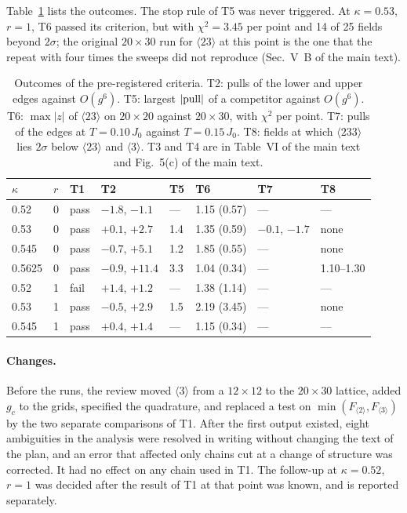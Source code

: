 \documentclass[aps,prb,twocolumn,superscriptaddress,floatfix]{revtex4-2}
\begin{document}
Table~\ref{tab:prereg} lists the outcomes. The stop rule of T5 was never triggered. At $\kappa=0.53$, $r=1$, T6
passed its criterion, but with $\chi^2=3.45$ per point and 14 of 25 fields beyond $2\sigma$; the original $20\times30$ run
for $\langle23\rangle$ at this point is the one that the repeat with four times the sweeps did not reproduce
(Sec.~V~B of the main text).

\begin{table}
\caption{Outcomes of the pre-registered criteria. T2: pulls of the lower and upper edges against $O(g^6)$. T5: largest
$|{\rm pull}|$ of a competitor against $O(g^6)$. T6: $\max|z|$ of $\langle23\rangle$ on $20\times20$ against
$20\times30$, with $\chi^2$ per point. T7: pulls of the edges at $T=0.10\,J_0$ against $T=0.15\,J_0$. T8: fields at which
$\langle233\rangle$ lies $2\sigma$ below $\langle23\rangle$ and $\langle3\rangle$. T3 and T4 are in
Table~VI of the main text and Fig.~5(c) of the main text.}
\label{tab:prereg}
\footnotesize
\begin{ruledtabular}
\begin{tabular}{llllllll}
$\kappa$ & $r$ & T1 & T2 & T5 & T6 & T7 & T8 \\
\hline
0.52   & 0 & pass & $-1.8$, $-1.1$  & ---   & 1.15 (0.57) & --- & --- \\
0.53   & 0 & pass & $+0.1$, $+2.7$  & 1.4   & 1.35 (0.59) & $-0.1$, $-1.7$ & none \\
0.545  & 0 & pass & $-0.7$, $+5.1$  & 1.2   & 1.85 (0.55) & --- & none \\
0.5625 & 0 & pass & $-0.9$, $+11.4$ & 3.3   & 1.04 (0.34) & --- & 1.10--1.30 \\
0.52   & 1 & fail & $+1.4$, $+1.2$  & ---   & 1.38 (1.14) & --- & --- \\
0.53   & 1 & pass & $-0.5$, $+2.9$  & 1.5   & 2.19 (3.45) & --- & none \\
0.545  & 1 & pass & $+0.4$, $+1.4$  & ---   & 1.15 (0.34) & --- & --- \\
\end{tabular}
\end{ruledtabular}
\end{table}

\paragraph*{Changes.} Before the runs, the review moved $\langle3\rangle$ from a $12\times12$ to the
$20\times30$ lattice, added $g_c$ to the grids, specified the quadrature, and replaced a test on
$\min(F_{\langle2\rangle},F_{\langle3\rangle})$ by the two separate comparisons of T1. After the first
output existed, eight ambiguities in the analysis were resolved in writing without changing the text of
the plan, and an error that affected only chains cut at a change of structure was corrected. It had no
effect on any chain used in T1. The follow-up at $\kappa=0.52$, $r=1$ was decided after the result of
T1 at that point was known, and is reported separately.
\end{document}
